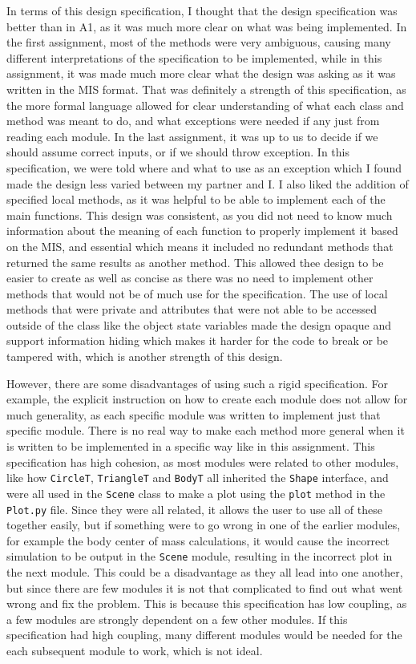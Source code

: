 \documentclass[12pt]{article}
\begin{document}
In terms of this design specification, I thought that the design specification was better than in 
A1, as it was much more clear on what was being implemented. In the first assignment, most of the 
methods were very ambiguous, causing many different interpretations of the specification to be 
implemented, while in this assignment, it was made much more clear what the design was asking as 
it was written in the MIS format. That was definitely a strength of this specification, as the 
more formal language allowed for clear understanding of what each class and method was meant to 
do, and what exceptions were needed if any just from reading each module. In the last assignment, 
it was up to us to decide if we should assume correct inputs, or if we should throw exception. In 
this specification, we were told where and what to use as an exception which I found made the 
design less varied between my partner and I. I also liked the addition of specified local 
methods, as it was helpful to be able to implement each of the main functions. This design was 
consistent, as you did not need to know much information about the meaning of each function to 
properly implement it based on the MIS, and essential which means it included no redundant 
methods that returned the same results as another method. This allowed thee design to be easier 
to create as well as concise as there was no need to implement other methods that would not be of 
much use for the specification. The use of local methods that were private and attributes that 
were not able to be accessed outside of the class like the object state variables made the design 
opaque and support information hiding which makes it harder for the code to break or be tampered 
with, which is another strength of this design. 

However, there are some disadvantages of using such a rigid specification. For example, the 
explicit instruction on how to create each module does not allow for much generality, as each 
specific module was written to implement just that specific module. There is no real way to make 
each method more general when it is written to be implemented in a specific way like in this 
assignment. This specification has high cohesion, as most modules were related to other modules, 
like how \verb|CircleT|, \verb|TriangleT| and \verb|BodyT| all inherited the \verb|Shape| 
interface, and were all used in the \verb|Scene| class to make a plot using the \verb|plot| 
method in the \verb|Plot.py| file. Since they were all related, it allows the user to use all of 
these together easily, but if something were to go wrong in one of the earlier modules, for 
example the body center of mass calculations, it would cause the incorrect simulation to be 
output in the \verb|Scene| module, resulting in the incorrect plot in the next module. This could 
be a disadvantage as they all lead into one another, but since there are few modules it is not 
that complicated to find out what went wrong and fix the problem. This is because this 
specification has low coupling, as a few modules are strongly dependent on a few other modules. 
If this specification had high coupling, many different modules would be needed for the each 
subsequent module to work, which is not ideal. 
\end{document}
